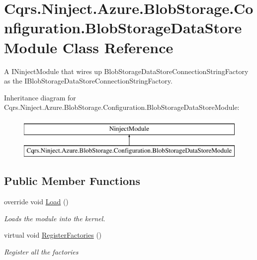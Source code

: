 \hypertarget{classCqrs_1_1Ninject_1_1Azure_1_1BlobStorage_1_1Configuration_1_1BlobStorageDataStoreModule}{}\section{Cqrs.\+Ninject.\+Azure.\+Blob\+Storage.\+Configuration.\+Blob\+Storage\+Data\+Store\+Module Class Reference}
\label{classCqrs_1_1Ninject_1_1Azure_1_1BlobStorage_1_1Configuration_1_1BlobStorageDataStoreModule}


A I\+Ninject\+Module that wires up Blob\+Storage\+Data\+Store\+Connection\+String\+Factory as the I\+Blob\+Storage\+Data\+Store\+Connection\+String\+Factory.  


Inheritance diagram for Cqrs.\+Ninject.\+Azure.\+Blob\+Storage.\+Configuration.\+Blob\+Storage\+Data\+Store\+Module\+:\begin{figure}[H]
\begin{center}
\leavevmode
\includegraphics[height=2.000000cm]{classCqrs_1_1Ninject_1_1Azure_1_1BlobStorage_1_1Configuration_1_1BlobStorageDataStoreModule}
\end{center}
\end{figure}
\subsection*{Public Member Functions}
\begin{DoxyCompactItemize}
\item 
override void \hyperlink{classCqrs_1_1Ninject_1_1Azure_1_1BlobStorage_1_1Configuration_1_1BlobStorageDataStoreModule_a6d22aa3f1093d4892b298dc770430a89_a6d22aa3f1093d4892b298dc770430a89}{Load} ()
\begin{DoxyCompactList}\small\item\em Loads the module into the kernel. \end{DoxyCompactList}\item 
virtual void \hyperlink{classCqrs_1_1Ninject_1_1Azure_1_1BlobStorage_1_1Configuration_1_1BlobStorageDataStoreModule_a275c2a6bb6004ad0a5119041d64097be_a275c2a6bb6004ad0a5119041d64097be}{Register\+Factories} ()
\begin{DoxyCompactList}\small\item\em Register all the factories \end{DoxyCompactList}\end{DoxyCompactItemize}


